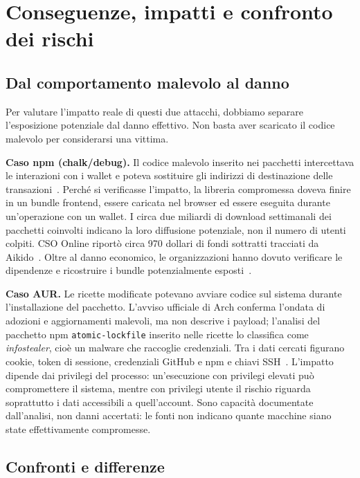 \section{Conseguenze, impatti e confronto dei rischi}
\label{sec:conseguenze}

\subsection{Dal comportamento malevolo al danno}

Per valutare l'impatto reale di questi due attacchi, dobbiamo separare l'esposizione potenziale dal danno effettivo. Non basta aver scaricato il codice malevolo per considerarsi una vittima.

\textbf{Caso npm (chalk/debug).} Il codice malevolo inserito nei pacchetti intercettava le interazioni con i wallet e poteva sostituire gli indirizzi di destinazione delle transazioni~\cite{debug2025}. Perché si verificasse l'impatto, la libreria compromessa doveva finire in un bundle frontend, essere caricata nel browser ed essere eseguita durante un'operazione con un wallet. I circa due miliardi di download settimanali dei pacchetti coinvolti indicano la loro diffusione potenziale, non il numero di utenti colpiti. CSO Online riportò circa 970 dollari di fondi sottratti tracciati da Aikido~\cite{cso2025}. Oltre al danno economico, le organizzazioni hanno dovuto verificare le dipendenze e ricostruire i bundle potenzialmente esposti~\cite{wiz2025}.

\textbf{Caso AUR.} Le ricette modificate potevano avviare codice sul sistema durante l'installazione del pacchetto. L'avviso ufficiale di Arch conferma l'ondata di adozioni e aggiornamenti malevoli, ma non descrive i payload; l'analisi del pacchetto npm \texttt{atomic-lockfile} inserito nelle ricette lo classifica come \emph{infostealer}, cioè un malware che raccoglie credenziali. Tra i dati cercati figurano cookie, token di sessione, credenziali GitHub e npm e chiavi SSH~\cite{arch-aur-incident-2026,ioctl2026}. L'impatto dipende dai privilegi del processo: un'esecuzione con privilegi elevati può compromettere il sistema, mentre con privilegi utente il rischio riguarda soprattutto i dati accessibili a quell'account. Sono capacità documentate dall'analisi, non danni accertati: le fonti non indicano quante macchine siano state effettivamente compromesse.
\subsection{Confronti e differenze}

